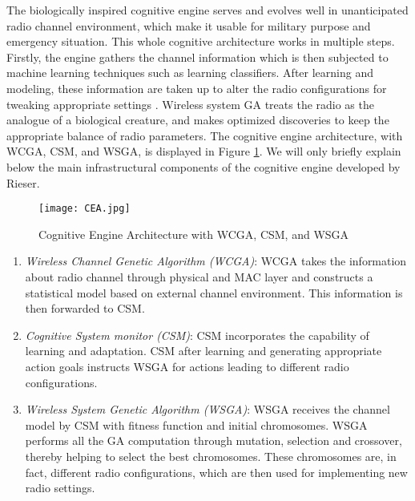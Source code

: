 \documentclass[journal]{IEEEtran}
\begin{document}
The biologically inspired cognitive engine serves and evolves well in unanticipated radio channel environment, which make it usable for military purpose and emergency situation. This whole cognitive architecture works in multiple steps. Firstly, the engine gathers the channel information which is then subjected to machine learning techniques such as learning classifiers. After learning and modeling, these information are taken up to alter the radio configurations for tweaking appropriate settings \cite{fette2009cognitive}. Wireless system GA treats the radio as the analogue of a biological creature, and makes optimized discoveries to keep the appropriate balance of radio parameters. The cognitive engine architecture, with WCGA, CSM, and WSGA, is displayed in Figure \ref{fig:CEarchitecture}. We will only briefly explain below the main infrastructural components of the cognitive engine developed by Rieser. 

\begin{figure}[ht!]
\centering
\texttt{[image: CEA.jpg]}
\caption{Cognitive Engine Architecture with WCGA, CSM, and WSGA \cite{fette2009cognitive}}
\label{fig:CEarchitecture}
\end{figure}
  
\vspace{2mm}  
  
\begin{enumerate}

\item \emph{Wireless Channel Genetic Algorithm (WCGA)}: WCGA takes the information about radio channel through physical and MAC layer and constructs a statistical model based on external channel environment. This information is then forwarded to CSM.
  
\item \emph{Cognitive System monitor (CSM)}: CSM incorporates the capability of learning and adaptation. CSM after learning and generating appropriate action goals instructs WSGA \cite{fette2009cognitive} for actions leading to different radio configurations.
  
\item \emph{Wireless System Genetic Algorithm (WSGA)}: WSGA receives the channel model by CSM with fitness function and initial chromosomes. WSGA performs all the GA computation through mutation, selection and crossover, thereby helping to select the best chromosomes. These chromosomes are, in fact, different radio configurations, which are then used for implementing new radio settings.

\end{enumerate}
\end{document}
